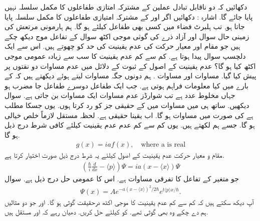 دکھائیں کہ دو ناقابل تبادل عملین کے مشترکہ امتازی طفاعلوں کا مکمل سلسلہ نہیں پایا جائے گا.
اشارہ : دکھائیں اگر  اور  کے مشترکہ امتیازی طفاعلوں کا مکمل سلسلہ پایا جاتا ہو, تب ہلبرٹ فضاء میں کسی بھی طفاعل کیلئے  ہو گا.
ہم ہارمونی مرتعش کی زمینی حال سوال  اور آزاد ذرے کی گوثی موجی اکٹھ سوال  کے تفاعل موج دیکھ چکے ہیں جو مقام اور معیار حرکت کی عدم یقینیت کی حد  کو چھوتے ہیں. اس سے ایک دلچسپ سوال پیدا ہوتا ہے. کم سے کم عدم یقینیت کا سب سے زیادہ عمومی موجی اکٹھ کیا ہو گا؟ عدم یقینیت کے اصول کے ثبوت کے دلائل میں عدم مساوات دو نقتوں پر پیش کیا گیا. مساوات  اور مساوات . ہم دونوں جگہ مساوات لیتے ہوئے دیکھتے ہیں کہ   کے بارے میں کیا معلومات فراہم ہوتی ہے. جب ایک طفاعل دوسرے طفاعل جا مضرب ہو   جہاں  مخلوط عدد ہے تب شوارڈز عدم مساوات ایک مساوات بن جاتی ہے. سوال  دیکھیں. ساتھ ہی میں مساوات  میں  کے حقیقی جز کو رد کرتا ہوں. یوں  جسکا مطلب ہے   کی صورت میں مساوات ہو گا. اب  یقینا حقیقی ہے. لحظہ مستقل  لازماً خلص خیالی ہو گا. جسے ہم  لکھتے ہیں. یوں کم سے کم عدم عدم یقینیت کیلئے کافی شرط درج ذیل ہو گا. 
\begin{align}
g(x) = iaf(x), \quad \text{where a is real}
\end{align}
مقام و معیار حرکت عدم یقینیت کے اصول کیلئے یہ شرط درج ذیل صورت اختیار کرتا ہے. 
\begin{align}
\left( \frac{\hbar}{i} \frac{d}{dx} - \langle p \rangle \right) \Psi = ia(x-\langle x \rangle ) \Psi 
\end{align}
جو متغیر  کے تفاعل  کا تفرقی مساوات ہے. اس کا عمومی حل درج ذیل ہے. سوال  
\begin{align}
\Psi(x) = Ae^{-a(x-\langle x \rangle )^{2}/2\hbar}e^{t\langle p \rangle x / \hbar}.
\end{align}
آپ دیکھ سکتے ہیں کہ کم سے کم عدم یقینیت کا موجی اکٹھ درحقیقت گوثی ہو گا. اور جو دو مثالیں ہم دے چکے وہ بھی گوثی تھے. 
 کو کیلئے حل کریں. دھیان رہے کہ  اور  مستقل ہیں.
 
